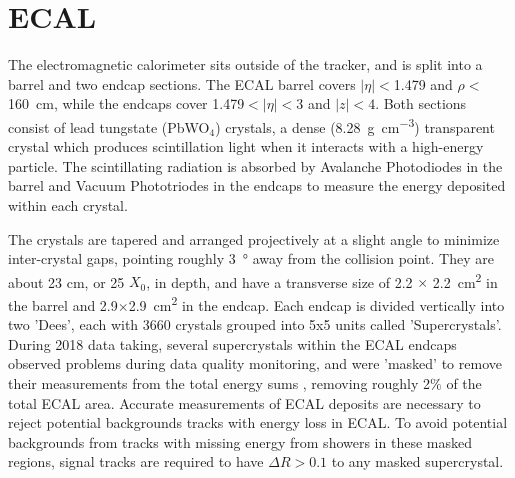 \section{ECAL}
The electromagnetic calorimeter sits outside of the tracker, and is split into a barrel and two endcap sections. 
The ECAL barrel covers $\lvert\eta\rvert<$1.479 and $\rho<$\SI{160}{\centi\meter}, while the endcaps cover 1.479$<\lvert\eta\rvert<$3 and $\lvert z \rvert<4$. 
Both sections consist of lead tungstate (PbWO$_4$) crystals, a dense (\SI{8.28}{\gram\per\cubic\centi\meter}) transparent crystal which produces scintillation light when it interacts with a high-energy particle. 
The scintillating radiation is absorbed by Avalanche Photodiodes in the barrel and Vacuum Phototriodes in the endcaps to measure the energy deposited within each 
crystal. 

The crystals are tapered and arranged projectively at a slight angle to minimize inter-crystal gaps, pointing roughly \SI{3}{\degree} away from the collision point. 
They are about 23 cm, or 25 $X_0$, in depth, and have a transverse size of 2.2 $\times$ \SI{2.2}{\centi\meter^2} in the barrel and 2.9$\times$\SI{2.9}{\centi\meter^2} in the endcap. 
Each endcap is divided vertically into two 'Dees', each with 3660 crystals grouped into 5x5 units called 'Supercrystals'. 
During 2018 data taking, several supercrystals within the ECAL endcaps observed problems during data quality monitoring, and were 'masked' to remove their measurements from the total energy sums , removing roughly 2$\%$ of the total ECAL area.
Accurate measurements of ECAL deposits are necessary to reject potential backgrounds tracks with energy loss in ECAL.
To avoid potential backgrounds from tracks with missing energy from showers in these masked regions, signal tracks are required to have $\Delta R>0.1$ to any masked supercrystal.

